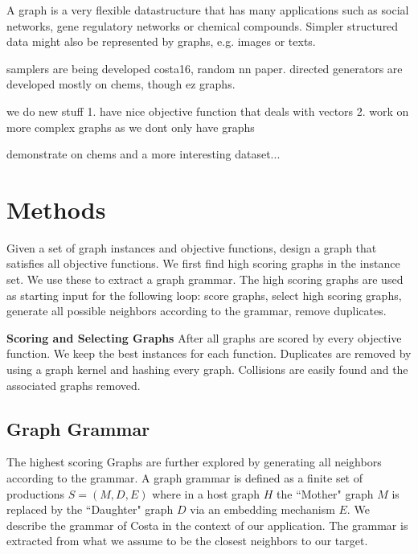 \documentclass{esannV2} \usepackage[dvips]{graphicx}
\begin{document}
A graph is a very flexible datastructure that has many applications such as
social networks, gene regulatory networks or chemical compounds. Simpler
structured data might also be represented by graphs, e.g. images or texts.



samplers are being developed costa16, random nn paper. 
directed generators are developed mostly on chems, 
though ez graphs. 

we do new stuff 1. have nice objective function that deals with vectors
2. work on more complex graphs as we dont only have graphs

demonstrate on chems and a more interesting dataset... 




\section{Methods}
Given a set of graph instances and objective functions, design a graph that
satisfies all objective functions.  We first find high scoring graphs in the
instance set. We use these to extract a graph grammar.  The high scoring graphs
are used as starting input for the following loop: score graphs, select high
scoring graphs, generate all possible neighbors according to the grammar,
remove duplicates.

\textbf{Scoring and Selecting Graphs} After all graphs are scored by every
objective function. We keep the best instances for each function.  Duplicates
are removed by using a graph kernel and hashing every graph.  Collisions are
easily found and the associated graphs removed.

\subsection{Graph Grammar} The highest scoring Graphs are further explored by
generating all neighbors according to the grammar. A graph grammar is defined
as a finite set of productions $S=(M,D,E)$ where in a host graph $H$ the
``Mother" graph $M$ is replaced by the ``Daughter" graph $D$ via an embedding
mechanism $E$. We describe the grammar of Costa \cite{costa16gl} in the context
of our application.  The grammar is extracted from what we assume to be the
closest neighbors to our target.
\end{document}
